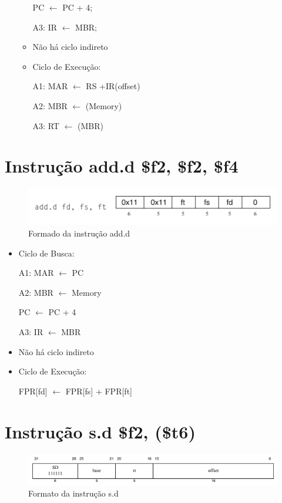 \documentclass[
	12pt,				%
	oneside,			%
	a4paper,			%
	english,			%
	brazil				%
	]{abntex2ppgsi}
\begin{document}
\begin{itemize}
\begin{itemize}
                    PC $\leftarrow$ PC + 4;
                
                A3: IR $\leftarrow$ MBR;

            \item Não há ciclo indireto
            \item Ciclo de Execução:

                A1: MAR $\leftarrow$ RS +IR(offset)
                
                A2: MBR $\leftarrow$ (Memory)
                
                A3: RT $\leftarrow$ (MBR)
        \end{itemize}
\end{itemize}

\section{Instrução add.d \$f2, \$f2, \$f4}

\begin{figure}[h]
    \centering
    \includegraphics[width=13cm]{49.png}
    \caption{Formado da instrução add.d}
    \label{fig49}
\end{figure}

\begin{itemize}
    \item Ciclo de Busca:

    A1: MAR $\leftarrow$ PC

    A2: MBR $\leftarrow$ Memory

    PC  $\leftarrow$ PC + 4

    A3: IR  $\leftarrow$ MBR

    \item Não há ciclo indireto
    \item Ciclo de Execução:

    FPR[fd] $\leftarrow$ FPR[fs] + FPR[ft]

\end{itemize}

\section{Instrução s.d \$f2, (\$t6)}

\begin{figure}[h]
    \centering
    \includegraphics[width=1\linewidth]{48.png}
    \caption{Formato da instrução s.d}
    \label{fig48}
\end{figure}
\end{document}
